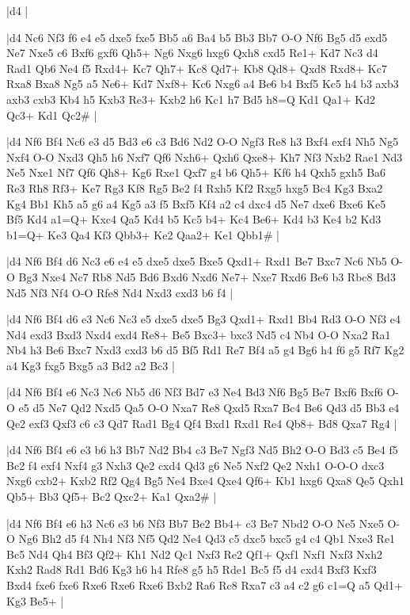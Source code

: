 \whitename{}
\blackname{}
\makegametitle
|d4  |

\whitename{}
\blackname{}
\makegametitle
|d4 Nc6 Nf3 f6 e4 e5 dxe5 fxe5 Bb5 a6 Ba4 b5 Bb3 Bb7 O-O Nf6 Bg5 d5 exd5 Ne7 Nxe5 c6 Bxf6 gxf6 Qh5+ Ng6 Nxg6 hxg6 Qxh8 cxd5 Re1+ Kd7 Nc3 d4 Rad1 Qb6 Ne4 f5 Rxd4+ Kc7 Qh7+ Kc8 Qd7+ Kb8 Qd8+ Qxd8 Rxd8+ Kc7 Rxa8 Bxa8 Ng5 a5 Ne6+ Kd7 Nxf8+ Kc6 Nxg6 a4 Be6 b4 Bxf5 Kc5 h4 b3 axb3 axb3 cxb3 Kb4 h5 Kxb3 Re3+ Kxb2 h6 Kc1 h7 Bd5 h8=Q Kd1 Qa1+ Kd2 Qc3+ Kd1 Qc2\#  |

\whitename{}
\blackname{}
\makegametitle
|d4 Nf6 Bf4 Nc6 e3 d5 Bd3 e6 c3 Bd6 Nd2 O-O Ngf3 Re8 h3 Bxf4 exf4 Nh5 Ng5 Nxf4 O-O Nxd3 Qh5 h6 Nxf7 Qf6 Nxh6+ Qxh6 Qxe8+ Kh7 Nf3 Nxb2 Rae1 Nd3 Ne5 Nxe1 Nf7 Qf6 Qh8+ Kg6 Rxe1 Qxf7 g4 b6 Qh5+ Kf6 h4 Qxh5 gxh5 Ba6 Re3 Rh8 Rf3+ Ke7 Rg3 Kf8 Rg5 Be2 f4 Rxh5 Kf2 Rxg5 hxg5 Bc4 Kg3 Bxa2 Kg4 Bb1 Kh5 a5 g6 a4 Kg5 a3 f5 Bxf5 Kf4 a2 c4 dxc4 d5 Ne7 dxe6 Bxe6 Ke5 Bf5 Kd4 a1=Q+ Kxc4 Qa5 Kd4 b5 Kc5 b4+ Kc4 Be6+ Kd4 b3 Ke4 b2 Kd3 b1=Q+ Ke3 Qa4 Kf3 Qbb3+ Ke2 Qaa2+ Ke1 Qbb1\#  |

\whitename{}
\blackname{}
\makegametitle
|d4 Nf6 Bf4 d6 Nc3 e6 e4 e5 dxe5 dxe5 Bxe5 Qxd1+ Rxd1 Be7 Bxc7 Nc6 Nb5 O-O Bg3 Nxe4 Nc7 Rb8 Nd5 Bd6 Bxd6 Nxd6 Ne7+ Nxe7 Rxd6 Be6 b3 Rbc8 Bd3 Nd5 Nf3 Nf4 O-O Rfe8 Nd4 Nxd3 cxd3 b6 f4  |

\whitename{}
\blackname{}
\makegametitle
|d4 Nf6 Bf4 d6 e3 Nc6 Nc3 e5 dxe5 dxe5 Bg3 Qxd1+ Rxd1 Bb4 Rd3 O-O Nf3 e4 Nd4 exd3 Bxd3 Nxd4 exd4 Re8+ Be5 Bxc3+ bxc3 Nd5 c4 Nb4 O-O Nxa2 Ra1 Nb4 h3 Be6 Bxc7 Nxd3 cxd3 b6 d5 Bf5 Rd1 Re7 Bf4 a5 g4 Bg6 h4 f6 g5 Rf7 Kg2 a4 Kg3 fxg5 Bxg5 a3 Bd2 a2 Bc3  |

\whitename{}
\blackname{}
\makegametitle
|d4 Nf6 Bf4 e6 Nc3 Nc6 Nb5 d6 Nf3 Bd7 e3 Ne4 Bd3 Nf6 Bg5 Be7 Bxf6 Bxf6 O-O e5 d5 Ne7 Qd2 Nxd5 Qa5 O-O Nxa7 Re8 Qxd5 Rxa7 Bc4 Be6 Qd3 d5 Bb3 e4 Qe2 exf3 Qxf3 c6 c3 Qd7 Rad1 Bg4 Qf4 Bxd1 Rxd1 Re4 Qb8+ Bd8 Qxa7 Rg4  |

\whitename{}
\blackname{}
\makegametitle
|d4 Nf6 Bf4 e6 e3 b6 h3 Bb7 Nd2 Bb4 c3 Be7 Ngf3 Nd5 Bh2 O-O Bd3 c5 Be4 f5 Bc2 f4 exf4 Nxf4 g3 Nxh3 Qe2 cxd4 Qd3 g6 Ne5 Nxf2 Qe2 Nxh1 O-O-O dxc3 Nxg6 cxb2+ Kxb2 Rf2 Qg4 Bg5 Ne4 Bxe4 Qxe4 Qf6+ Kb1 hxg6 Qxa8 Qe5 Qxh1 Qb5+ Bb3 Qf5+ Bc2 Qxc2+ Ka1 Qxa2\#  |

\whitename{}
\blackname{}
\makegametitle
|d4 Nf6 Bf4 e6 h3 Nc6 e3 b6 Nf3 Bb7 Be2 Bb4+ c3 Be7 Nbd2 O-O Ne5 Nxe5 O-O Ng6 Bh2 d5 f4 Nh4 Nf3 Nf5 Qd2 Ne4 Qd3 c5 dxc5 bxc5 g4 c4 Qb1 Nxe3 Re1 Bc5 Nd4 Qh4 Bf3 Qf2+ Kh1 Nd2 Qc1 Nxf3 Re2 Qf1+ Qxf1 Nxf1 Nxf3 Nxh2 Kxh2 Rad8 Rd1 Bd6 Kg3 h6 h4 Rfe8 g5 h5 Rde1 Bc5 f5 d4 cxd4 Bxf3 Kxf3 Bxd4 fxe6 fxe6 Rxe6 Rxe6 Rxe6 Bxb2 Ra6 Rc8 Rxa7 c3 a4 c2 g6 c1=Q a5 Qd1+ Kg3 Be5+  |

